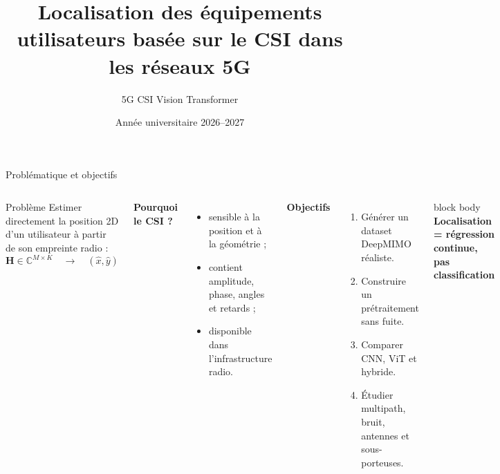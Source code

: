 \documentclass[aspectratio=169,10pt]{beamer}
\title{Localisation des équipements utilisateurs basée sur le CSI dans les réseaux 5G}
\subtitle{5G CSI Vision Transformer}
\author{\Auteur}
\institute{\Etablissement\\Encadré par : \Encadrant}
\date{Année universitaire 2026--2027}
\newcommand{\keybox}[1]{%
  \begin{beamercolorbox}[rounded=true,sep=0.7em,center]{block body}
    \textbf{\color{insatblue}#1}
  \end{beamercolorbox}%
}
\begin{document}
\begin{frame}[plain]
  \titlepage
  \vspace{-0.4cm}
  \begin{center}
  \end{center}
\end{frame}

\begin{frame}{Problématique et objectifs}
  \begin{columns}[T,onlytextwidth]
      \begin{block}{Problème}
        Estimer directement la position 2D d'un utilisateur à partir de son
        empreinte radio :
        \[
          \mathbf H\in\mathbb C^{M\times K}
          \quad\longrightarrow\quad
          (\widehat{x},\widehat{y})
        \]
      \end{block}
      \vspace{0.15cm}
      \textbf{Pourquoi le CSI ?}
      \begin{itemize}
        \item sensible à la position et à la géométrie ;
        \item contient amplitude, phase, angles et retards ;
        \item disponible dans l'infrastructure radio.
      \end{itemize}

      \textbf{Objectifs}
      \begin{enumerate}
        \item Générer un dataset DeepMIMO réaliste.
        \item Construire un prétraitement sans fuite.
        \item Comparer CNN, ViT et hybride.
        \item Étudier multipath, bruit, antennes et sous-porteuses.
      \end{enumerate}
      \vspace{0.25cm}
      \keybox{Localisation = régression continue, pas classification}
  \end{columns}
\end{frame}
\end{document}

